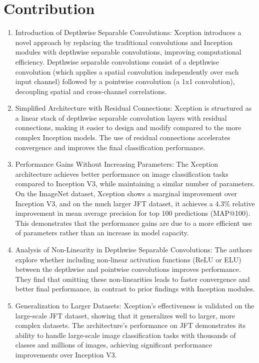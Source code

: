 \documentclass{report}
\begin{document}
	
	\section{Contribution}
	\begin{enumerate}
		\item 
		Introduction of Depthwise Separable Convolutions: Xception introduces a novel approach by replacing the traditional convolutions and Inception modules with depthwise separable convolutions, improving computational efficiency. Depthwise separable convolutions consist of a depthwise convolution (which applies a spatial convolution independently over each input channel) followed by a pointwise convolution (a 1x1 convolution), decoupling spatial and cross-channel correlations.
		
		\item 
		Simplified Architecture with Residual Connections: Xception is structured as a linear stack of depthwise separable convolution layers with residual connections, making it easier to design and modify compared to the more complex Inception models. The use of residual connections accelerates convergence and improves the final classification performance.
		
		\item 
		Performance Gains Without Increasing Parameters: The Xception architecture achieves better performance on image classification tasks compared to Inception V3, while maintaining a similar number of parameters. On the ImageNet dataset, Xception shows a marginal improvement over Inception V3, and on the much larger JFT dataset, it achieves a 4.3\% relative improvement in mean average precision for top 100 predictions (MAP@100). This demonstrates that the performance gains are due to a more efficient use of parameters rather than an increase in model capacity.
		
		\item 
		Analysis of Non-Linearity in Depthwise Separable Convolutions: The authors explore whether including non-linear activation functions (ReLU or ELU) between the depthwise and pointwise convolutions improves performance. They find that omitting these non-linearities leads to faster convergence and better final performance, in contrast to prior findings with Inception modules.
		
		\item 
		Generalization to Larger Datasets: Xception's effectiveness is validated on the large-scale JFT dataset, showing that it generalizes well to larger, more complex datasets. The architecture’s performance on JFT demonstrates its ability to handle large-scale image classification tasks with thousands of classes and millions of images, achieving significant performance improvements over Inception V3.
	\end{enumerate}
	
\end{document}

